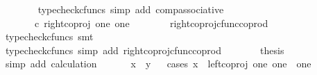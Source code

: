 \begin{isabellebody}
\ \ \ \ \ \ \isamarkupfalse%
\ {\isacharparenleft}{\kern0pt}typecheck{\isacharunderscore}{\kern0pt}cfuncs{\isacharcomma}{\kern0pt}\ simp\ add{\isacharcolon}{\kern0pt}\ comp{\isacharunderscore}{\kern0pt}associative{}{\isacharparenright}{\kern0pt}\isanewline
\ \ \ \ \isamarkupfalse%
\ \isamarkupfalse%
\ {\isachardoublequoteopen}{\isachardot}{\kern0pt}{\isachardot}{\kern0pt}{\isachardot}{\kern0pt}\ {\isacharequal}{\kern0pt}\ {\isasymlangle}{\isasymf}{\isacharcomma}{\kern0pt}\ {\isasymf}{\isasymrangle}\ {\isasymamalg}\ {\isasymlangle}{\isasymf}{\isacharcomma}{\kern0pt}{\isasymt}{\isasymrangle}\ {\isasymcirc}\isactrlsub c\ right{\isacharunderscore}{\kern0pt}coproj\ one\ one{\isachardoublequoteclose}\isanewline
\ \ \ \ \ \ \isamarkupfalse%
\ right{\isacharunderscore}{\kern0pt}coproj{\isacharunderscore}{\kern0pt}cfunc{\isacharunderscore}{\kern0pt}coprod\ \isamarkupfalse%
\ {\isacharparenleft}{\kern0pt}typecheck{\isacharunderscore}{\kern0pt}cfuncs{\isacharcomma}{\kern0pt}\ smt{\isacharparenright}{\kern0pt}\isanewline
\ \ \ \ \isamarkupfalse%
\ \isamarkupfalse%
\ {\isachardoublequoteopen}{\isachardot}{\kern0pt}{\isachardot}{\kern0pt}{\isachardot}{\kern0pt}\ {\isacharequal}{\kern0pt}\ {\isasymlangle}{\isasymf}{\isacharcomma}{\kern0pt}{\isasymt}{\isasymrangle}{\isachardoublequoteclose}\isanewline
\ \ \ \ \ \ \isamarkupfalse%
\ {\isacharparenleft}{\kern0pt}typecheck{\isacharunderscore}{\kern0pt}cfuncs{\isacharcomma}{\kern0pt}\ simp\ add{\isacharcolon}{\kern0pt}\ right{\isacharunderscore}{\kern0pt}coproj{\isacharunderscore}{\kern0pt}cfunc{\isacharunderscore}{\kern0pt}coprod{\isacharparenright}{\kern0pt}\isanewline
\ \ \ \ \isamarkupfalse%
\ \isamarkupfalse%
\ {\isacharquery}{\kern0pt}thesis\isanewline
\ \ \ \ \ \ \isamarkupfalse%
\ {\isacharparenleft}{\kern0pt}simp\ add{\isacharcolon}{\kern0pt}\ calculation{\isacharparenright}{\kern0pt}\isanewline
\ \ \isamarkupfalse%
\isanewline
\ \ \isamarkupfalse%
\ {\isachardoublequoteopen}x\ {\isacharequal}{\kern0pt}\ y{\isachardoublequoteclose}\isanewline
\ \ \isamarkupfalse%
{\isacharparenleft}{\kern0pt}cases\ {\isachardoublequoteopen}x\ {\isacharequal}{\kern0pt}\ left{\isacharunderscore}{\kern0pt}coproj\ one\ {\isacharparenleft}{\kern0pt}one\ {\isasymCoprod}\ one{\isacharparenright}{\kern0pt}{\isachardoublequoteclose}{\isacharparenright}{\kern0pt}\isanewline
\ \ \ \ \isamarkupfalse%

\end{isabellebody}
